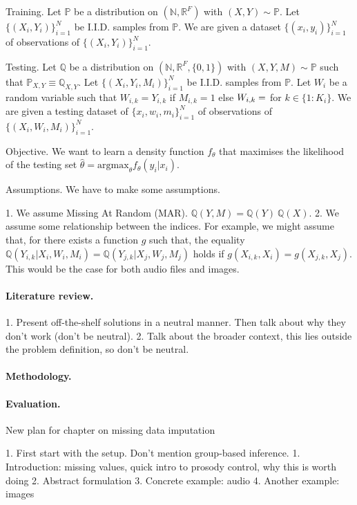 \documentclass[a4paper,12pt,twoside,openright]{report}
\begin{document}
Training. Let $\mathbb{P}$ be a distribution on $(\mathbb{N}, \mathbb{R}^{F})$ with $(X, Y) \sim \mathbb{P}$. Let $\{(X_i, Y_i)\}_{i=1}^N$ be I.I.D. samples from $\mathbb{P}$. We are given a dataset $\{(x_i, y_i)\}_{i=1}^N$ of observations of $\{(X_i, Y_i)\}_{i=1}^N$.

Testing. Let $\mathbb{Q}$ be a distribution on $(\mathbb{N}, \mathbb{R}^{F}, \{0, 1\})$ with $(X, Y, M) \sim \mathbb{P}$ such that $\mathbb{P}_{X,Y} \equiv \mathbb{Q}_{X, Y}$. Let $\{(X_i, Y_i, M_i)\}_{i=1}^N$ be I.I.D. samples from $\mathbb{P}$. Let $W_i$ be a random variable such that $W_{i,k} = Y_{i,k}$ if $M_{i,k} = 1$ else $W_{i,k} = \empty$ for $k \in \{1:K_i\}$. We are given a testing dataset of $\{x_i, w_i, m_i\}_{i=1}^N$ of observations of $\{(X_i, W_i, M_i)\}_{i=1}^N$.

Objective. We want to learn a density function $f_\theta$ that maximises the likelihood of the testing set $\hat{\theta} = \mathrm{argmax}_\theta f_\theta (y_i | x_i)$.

Assumptions. We have to make some assumptions.

1. We assume Missing At Random (MAR). $\mathbb{Q} (Y, M) = \mathbb{Q} (Y) ~ \mathbb{Q} (X)$.
2. We assume some relationship between the indices. For example, we might assume that, for there exists a function $g$ such that, the equality $\mathbb{Q} (Y_{i,k} | X_i, W_i, M_i) = \mathbb{Q} (Y_{j,k} | X_j, W_j, M_j)$  holds if $g(X_{i,k}, X_i) = g(X_{j,k}, X_j)$. This would be the case for both audio files and images.

\paragraph{Literature review.} 1. Present off-the-shelf solutions in a neutral manner. Then talk about why they don't work (don't be neutral).
2. Talk about the broader context, this lies outside the problem definition, so don't be neutral.

\paragraph{Methodology.}

\paragraph{Evaluation.}

New plan for chapter on missing data imputation

1. First start with the setup. Don't mention group-based inference.
    1. Introduction: missing values, quick intro to prosody control, why this is worth doing
    2. Abstract formulation
    3. Concrete example: audio
    4. Another example: images
        
\end{document}
